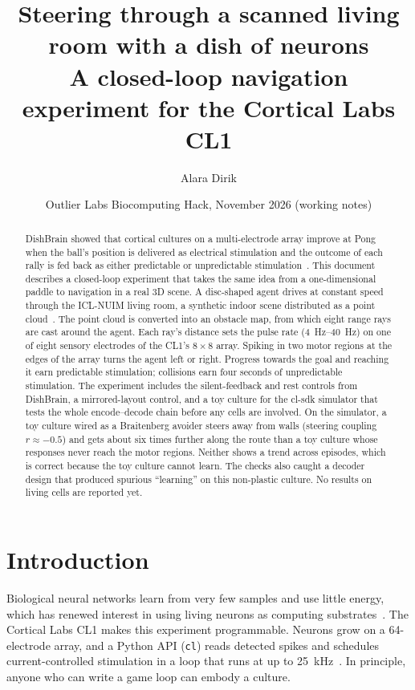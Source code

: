 \documentclass[11pt,a4paper]{article}
\title{Steering through a scanned living room with a dish of neurons\\[0.3em]
\large A closed-loop navigation experiment for the Cortical Labs CL1}
\author{Alara Dirik}
\date{Outlier Labs Biocomputing Hack, November 2026 \quad (working notes)}
\newcommand{\code}[1]{\texttt{#1}}
\begin{document}
\maketitle

\begin{abstract}
\noindent DishBrain showed that cortical cultures on a multi-electrode array improve at Pong when
the ball's position is delivered as electrical stimulation and the outcome of each rally is fed
back as either predictable or unpredictable stimulation~\citep{kagan2022dishbrain}. This document
describes a closed-loop experiment that takes the same idea from a one-dimensional paddle to
navigation in a real 3D scene. A disc-shaped agent drives at constant speed through the ICL-NUIM
living room, a synthetic indoor scene distributed as a point cloud~\citep{handa2014iclnuim,choi2015robust}.
The point cloud is converted into an obstacle map, from which eight range rays are cast around
the agent. Each ray's distance sets the pulse rate (\SIrange{4}{40}{\hertz}) on one of eight
sensory electrodes of the CL1's $8\times8$ array. Spiking in two motor regions at the edges of
the array turns the agent left or right. Progress towards the goal and reaching it earn
predictable stimulation; collisions earn four seconds of unpredictable stimulation. The
experiment includes the silent-feedback and rest controls from DishBrain, a mirrored-layout
control, and a toy culture for the cl-sdk simulator that tests the whole encode--decode chain
before any cells are involved. On the simulator, a toy culture wired as a Braitenberg avoider
steers away from walls (steering coupling $r\approx-0.5$) and gets about six times further along
the route than a toy culture whose responses never reach the motor regions. Neither shows a
trend across episodes, which is correct because the toy culture cannot learn. The checks also
caught a decoder design that produced spurious ``learning'' on this non-plastic culture. No
results on living cells are reported yet.
\end{abstract}

\section{Introduction}

Biological neural networks learn from very few samples and use little energy, which has
renewed interest in using living neurons as computing substrates~\citep{smirnova2022pong}. The
Cortical Labs CL1 makes this experiment programmable. Neurons grow on a 64-electrode array, and
a Python API (\code{cl}) reads detected spikes and schedules current-controlled stimulation in a
loop that runs at up to \SI{25}{\kilo\hertz}~\citep{clapidoc,clsdk}. In principle, anyone who
can write a game loop can embody a culture.
\end{document}
